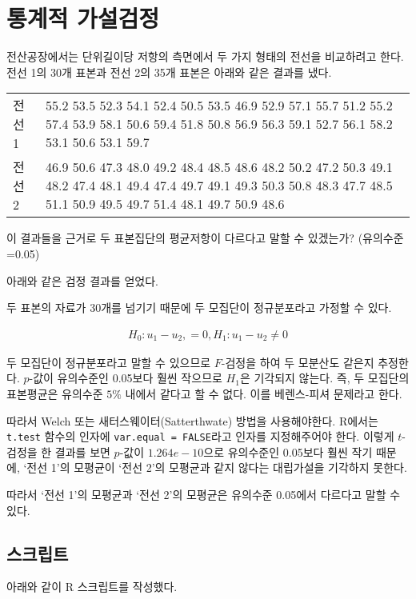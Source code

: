 \section{통계적 가설검정}
전산공장에서는 단위길이당 저항의 측면에서 두 가지 형태의 전선을 비교하려고
한다. 전선 1의 30개 표본과 전선 2의 35개 표본은 아래와 같은 결과를 냈다.

\begin{tabularx}{0.9\textwidth}{ l|X }
  \noalign{\smallskip}\hline\noalign{\smallskip}
  전선 1 & 
    55.2 53.5 52.3 54.1 52.4 50.5 53.5 46.9 52.9 57.1
    55.7 51.2 55.2 57.4 53.9 58.1 50.6 59.4 51.8 50.8
    56.9 56.3 59.1 52.7 56.1 58.2 53.1 50.6 53.1 59.7 \\
  전선 2 &
    46.9 50.6 47.3 48.0 49.2 48.4 48.5 48.6 48.2 50.2
    47.2 50.3 49.1 48.2 47.4 48.1 49.4 47.4 49.7 49.1
    49.3 50.3 50.8 48.3 47.7 48.5 51.1 50.9 49.5 49.7
    51.4 48.1 49.7 50.9 48.6
\end{tabularx}

이 결과들을 근거로 두 표본집단의 평균저항이 다르다고 말할 수 있겠는가?
{\small(유의수준=0.05)}

아래와 같은 검정 결과를 얻었다.


두 표본의 자료가 30개를 넘기기 때문에 두 모집단이 정규분포라고 가정할 수 있다.

\begin{align*}
  H_0: u_1 - u_2, = 0, H_1: u_1 - u_2 \not= 0
\end{align*}

두 모집단이 정규분포라고 말할 수 있으므로 $F$-검정을 하여 두 모분산도 같은지 추정한다.
$p$-값이 유의수준인 0.05보다 훨씬 작으므로 $H_1$은 기각되지 않는다.
즉, 두 모집단의 표본평균은 유의수준 $5\%$ 내에서 같다고 할 수 없다.
이를 베렌스-피셔 문제라고 한다.

따라서 Welch 또는 새터스웨이터(Satterthwate) 방법을 사용해야한다.
R에서는 \texttt{t.test} 함수의 인자에 \texttt{var.equal = FALSE}라고 인자를 지정해주어야 한다.
이렇게 $t$-검정을 한 결과를 보면 $p$-값이 $1.264e-10$으로 유의수준인 0.05보다 훨씬 작기 때문에,
`전선 1'의 모평균이 `전선 2'의 모평균과 같지 않다는 대립가설을 기각하지 못한다.

따라서 `전선 1'의 모평균과 `전선 2'의 모평균은 유의수준 0.05에서 다르다고 말할 수 있다.

\subsection{스크립트}
아래와 같이 R 스크립트를 작성했다.







